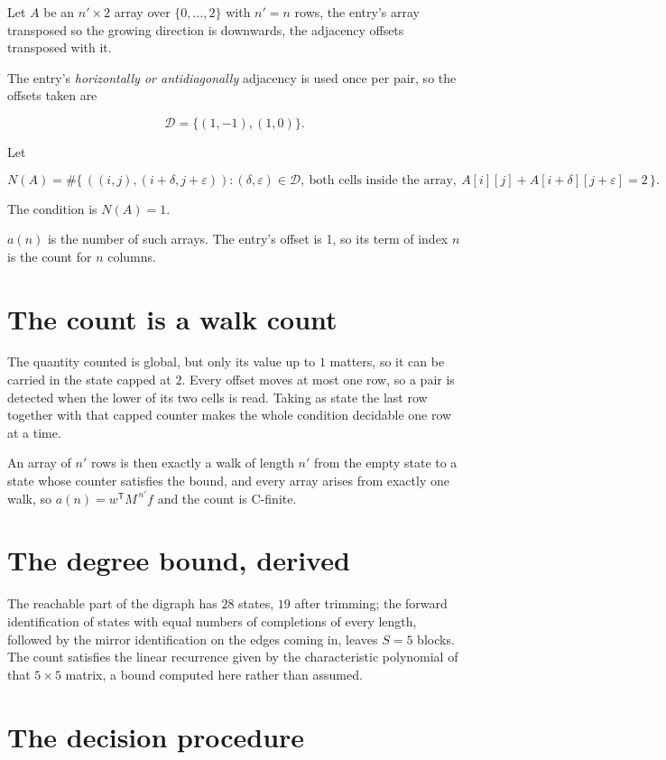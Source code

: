 \documentclass[11pt]{article}
\theoremstyle{definition}
\begin{document}
Let $A$ be an $n' \times 2$ array over $\{0,\dots,2\}$ with $n' = n$ rows, the entry's array transposed so the growing direction is downwards, the adjacency offsets transposed with it.

The entry's {\itshape horizontally or antidiagonally} adjacency is used once per pair, so the offsets taken are

\[\mathcal{D} = \{(1,-1), (1,0)\}.\]

Let

\[N(A) = \#\bigl\{\,((i,j),(i{+}\delta,j{+}\varepsilon)) : (\delta,\varepsilon) \in \mathcal{D},\ \text{both cells inside the array},\ A[i][j] + A[i{+}\delta][j{+}\varepsilon] = 2\,\bigr\}.\]

The condition is $N(A) = 1$.

$a(n)$ is the number of such arrays. The entry's offset is 1, so its term of index $n$ is the count for $n$ columns.

\section{The count is a walk count}

The quantity counted is global, but only its value up to $1$ matters, so it can be carried in the state capped at $2$. Every offset moves at most one row, so a pair is detected when the lower of its two cells is read. Taking as state the last row together with that capped counter makes the whole condition decidable one row at a time.

An array of $n'$ rows is then exactly a walk of length $n'$ from the empty state to a state whose counter satisfies the bound, and every array arises from exactly one walk, so $a(n) = w^{\mathsf T}M^{\,n'}f$ and the count is C-finite.

\section{The degree bound, derived}

The reachable part of the digraph has $28$ states, $19$ after trimming; the forward identification of states with equal numbers of completions of every length, followed by the mirror identification on the edges coming in, leaves $S = 5$ blocks. The count satisfies the linear recurrence given by the characteristic polynomial of that $5\times5$ matrix, a bound computed here rather than assumed.

\section{The decision procedure}
\end{document}

